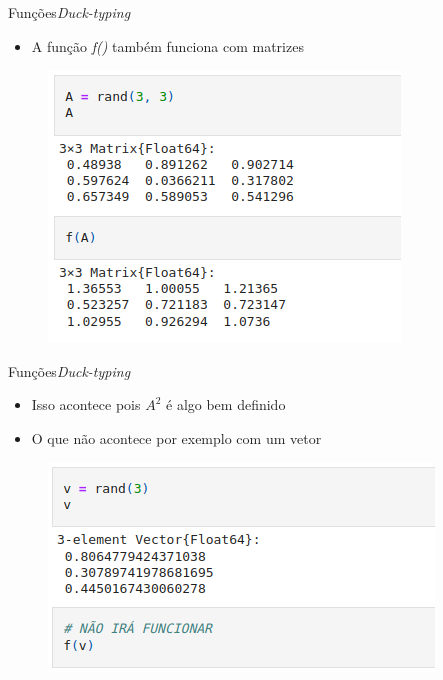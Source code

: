 \documentclass{beamer}
\begin{document}
\begin{frame}{Funções}{\textit{Duck-typing}}
    \begin{itemize}
        \item A função \textit{f()} também funciona com matrizes
    \end{itemize}
    \begin{figure}
        \centering
        \includegraphics[scale=0.4]{imagens/mat-ex-func.png}
        \label{fig:my_label}
    \end{figure}     
\end{frame}

\begin{frame}{Funções}{\textit{Duck-typing}}
    \begin{itemize}
        \item Isso acontece pois $A^2$ é algo bem definido
        \item O que não acontece por exemplo com um vetor
    \end{itemize}
    \begin{figure}
        \centering
        \includegraphics[scale=0.4]{imagens/vet-ex-func.png}
        \label{fig:my_label}
    \end{figure}     
\end{frame}
\end{document}
